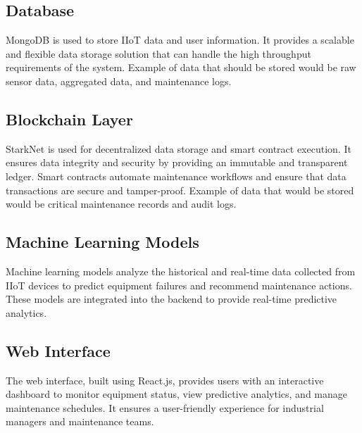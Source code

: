 \documentclass{article}
\begin{document}
\subsection{Database}

MongoDB is used to store IIoT data and user information. It provides a scalable and flexible data storage solution that can handle the high throughput requirements of the system. Example of data that should be stored would be raw sensor data, aggregated data, and maintenance logs.

\subsection{Blockchain Layer}

StarkNet is used for decentralized data storage and smart contract execution. It ensures data integrity and security by providing an immutable and transparent ledger. Smart contracts automate maintenance workflows and ensure that data transactions are secure and tamper-proof. Example of data that would be stored would be critical maintenance records and audit logs.

\subsection{Machine Learning Models}

Machine learning models analyze the historical and real-time data collected from IIoT devices to predict equipment failures and recommend maintenance actions. These models are integrated into the backend to provide real-time predictive analytics.

\subsection{Web Interface}

The web interface, built using React.js, provides users with an interactive dashboard to monitor equipment status, view predictive analytics, and manage maintenance schedules. It ensures a user-friendly experience for industrial managers and maintenance teams.




\end{document}
